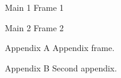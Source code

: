 \documentclass[aspectratio=169]{beamer}
\begin{document}
\begin{frame}{Main 1} Frame 1 \end{frame}
\begin{frame}{Main 2} Frame 2 \end{frame}

\appendix

\begin{frame}{Appendix A} Appendix frame. \end{frame}
\begin{frame}{Appendix B} Second appendix. \end{frame}
\end{document}
